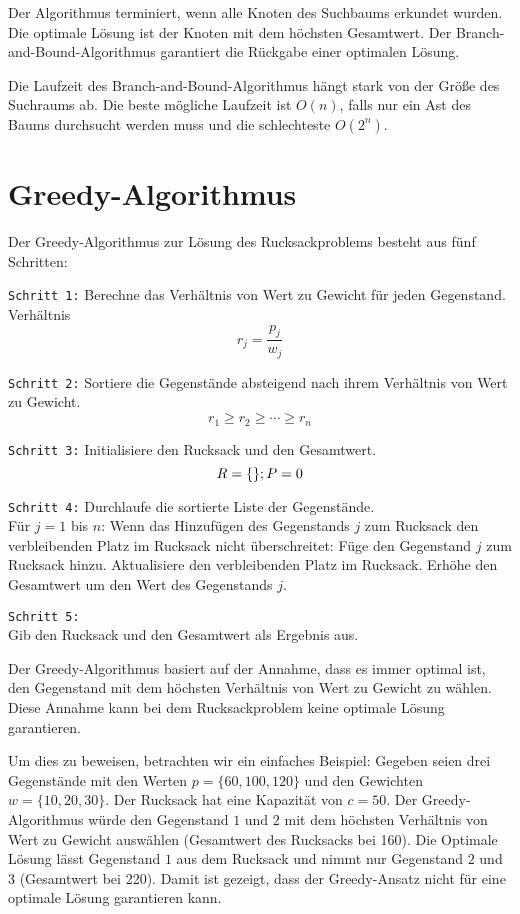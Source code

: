 Der Algorithmus terminiert, wenn alle Knoten des Suchbaums 
erkundet wurden. Die optimale Lösung ist der Knoten mit dem 
höchsten Gesamtwert. Der Branch-and-Bound-Algorithmus 
garantiert die Rückgabe einer optimalen Lösung.

Die Laufzeit des 
Branch-and-Bound-Algorithmus hängt stark von der Größe des 
Suchraums ab. Die beste mögliche Laufzeit ist 
$O(n)$, falls nur ein Ast des Baums durchsucht werden muss und 
die schlechteste $O(2^n)$.\ \cite[vgl.][]{Martello1987}

\section{Greedy-Algorithmus}
Der Greedy-Algorithmus zur Lösung des Rucksackproblems besteht 
aus fünf Schritten:

\texttt{Schritt 1:} Berechne das Verhältnis von Wert zu Gewicht für 
jeden Gegenstand.
Verhältnis \[r_j = \frac{p_j}{w_j}\]

\texttt{Schritt 2:} Sortiere die Gegenstände absteigend nach ihrem 
Verhältnis von Wert zu Gewicht.
\[r_1 \geq r_2 \geq \cdots \geq r_n\]

\texttt{Schritt 3:} Initialisiere den Rucksack und den Gesamtwert.
\[   \text{$R$} = \{\}; \\
    \text{$P$} = 0 \]

\texttt{Schritt 4:} Durchlaufe die sortierte Liste der Gegenstände.\\
Für $j = 1$ bis $n$: 
Wenn das Hinzufügen des Gegenstands $j$ zum Rucksack den 
verbleibenden Platz im Rucksack nicht überschreitet:
Füge den Gegenstand $j$ zum Rucksack hinzu.
Aktualisiere den verbleibenden Platz im Rucksack.
Erhöhe den Gesamtwert um den Wert des Gegenstands $j$.

\texttt{Schritt 5:} \\Gib den Rucksack und den Gesamtwert als Ergebnis 
aus.

Der Greedy-Algorithmus basiert auf der Annahme, dass es 
immer optimal ist, den Gegenstand mit dem höchsten Verhältnis 
von Wert zu Gewicht zu wählen. Diese Annahme kann bei dem Rucksackproblem
keine optimale Lösung garantieren.

Um dies zu beweisen, betrachten wir ein einfaches Beispiel: 
Gegeben seien drei Gegenstände mit den Werten $p = \{60, 100, 120\}$ 
und den Gewichten $w =\{10, 20, 30\}$. Der Rucksack hat eine Kapazität 
von $c = 50$. Der Greedy-Algorithmus würde den Gegenstand $1$ und $2$ mit 
dem höchsten Verhältnis von Wert zu Gewicht auswählen (Gesamtwert des Rucksacks bei 160). Die Optimale 
Lösung lässt Gegenstand $1$ aus dem Rucksack und nimmt nur Gegenstand $2$ und $3$ (Gesamtwert bei 220).
Damit ist gezeigt, dass der Greedy-Ansatz nicht für eine optimale Lösung 
garantieren kann.


